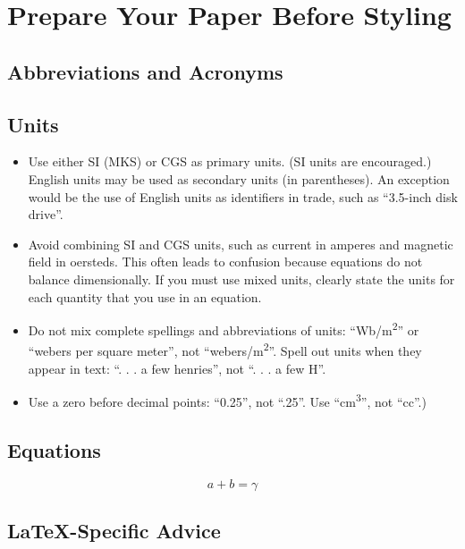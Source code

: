 \documentclass[conference]{IEEEtran}
\begin{document}
\section{Prepare Your Paper Before Styling}

\subsection{Abbreviations and Acronyms}\label{AA}

\subsection{Units}
\begin{itemize}
\item Use either SI (MKS) or CGS as primary units. (SI units are encouraged.) English units may be used as secondary units (in parentheses). An exception would be the use of English units as identifiers in trade, such as ``3.5-inch disk drive''.
\item Avoid combining SI and CGS units, such as current in amperes and magnetic field in oersteds. This often leads to confusion because equations do not balance dimensionally. If you must use mixed units, clearly state the units for each quantity that you use in an equation.
\item Do not mix complete spellings and abbreviations of units: ``Wb/m\textsuperscript{2}'' or ``webers per square meter'', not ``webers/m\textsuperscript{2}''. Spell out units when they appear in text: ``. . . a few henries'', not ``. . . a few H''.
\item Use a zero before decimal points: ``0.25'', not ``.25''. Use ``cm\textsuperscript{3}'', not ``cc''.)
\end{itemize}

\subsection{Equations}

\begin{equation}
a+b=\gamma\label{eq}
\end{equation}

\subsection{\LaTeX-Specific Advice}
\end{document}
